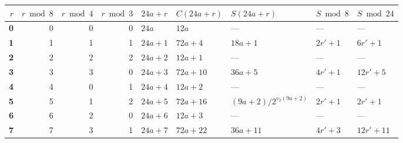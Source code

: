 \documentclass[11pt,a4paper]{article}
\theoremstyle{remark}
\theoremstyle{plain}
\begin{document}
\vspace{1em}
\noindent
\footnotesize
\setlength{\tabcolsep}{4pt}
\begin{tabular}{>{\bfseries}r|r|r|r|l|l|l|l|l}
\toprule
$r$ & $r \bmod 8$ & $r \bmod 4$ & $r \bmod 3$ & $24a + r$ & $C(24a + r)$ & $S(24a + r)$ & $S \bmod 8$ & $S \bmod 24$ \\
\midrule
\cellcolor{res0}  0  & \cellcolor{res0}0 & \cellcolor{res0}0 & \cellcolor{res0}0 & \cellcolor{res0}$24a$       & \cellcolor{res0}$12a$        & \cellcolor{res0}---                              & \cellcolor{res0}---           & \cellcolor{res0}--- \\
\cellcolor{res1}  1  & \cellcolor{res1}1 & \cellcolor{res1}1 & \cellcolor{res1}1 & \cellcolor{res1}$24a + 1$   & \cellcolor{res1}$72a + 4$    & \cellcolor{res1}$18a + 1$                      & \cellcolor{res1}$2r'+1$           & \cellcolor{res1}$6r'+1$ \\
\cellcolor{res2}  2  & \cellcolor{res2}2 & \cellcolor{res2}2 & \cellcolor{res2}2 & \cellcolor{res2}$24a + 2$   & \cellcolor{res2}$12a + 1$    & \cellcolor{res2}---                             & \cellcolor{res2}---           & \cellcolor{res2}--- \\
\cellcolor{res3}  3  & \cellcolor{res3}3 & \cellcolor{res3}3 & \cellcolor{res0}0 & \cellcolor{res3}$24a + 3$   & \cellcolor{res3}$72a + 10$   & \cellcolor{res3}$36a + 5$                      & \cellcolor{res3}$4r'+1$     & \cellcolor{res3}$12r'+5$ \\
\cellcolor{res4}  4  & \cellcolor{res4}4 & \cellcolor{res0}0 & \cellcolor{res1}1 & \cellcolor{res4}$24a + 4$   & \cellcolor{res4}$12a + 2$    & \cellcolor{res4}---                             & \cellcolor{res4}---           & \cellcolor{res4}--- \\
\cellcolor{res5}  5  & \cellcolor{res5}5 & \cellcolor{res1}1 & \cellcolor{res2}2 & \cellcolor{res5}$24a + 5$   & \cellcolor{res5}$72a + 16$   & \cellcolor{res5}$(9a + 2)/2^{v_2(9a+2)}$       & \cellcolor{res5}$2r'+1$           & \cellcolor{res5}$2r'+1$ \\
\cellcolor{res6}  6  & \cellcolor{res6}6 & \cellcolor{res2}2 & \cellcolor{res0}0 & \cellcolor{res6}$24a + 6$   & \cellcolor{res6}$12a + 3$    & \cellcolor{res6}---                             & \cellcolor{res6}---           & \cellcolor{res6}--- \\
\cellcolor{res7}  7  & \cellcolor{res7}7 & \cellcolor{res3}3 & \cellcolor{res1}1 & \cellcolor{res7}$24a + 7$   & \cellcolor{res7}$72a + 22$   & \cellcolor{res7}$36a + 11$                     & \cellcolor{res7}$4r'+3$     & \cellcolor{res7}$12r'+11$ \\

\end{tabular}
\end{document}
